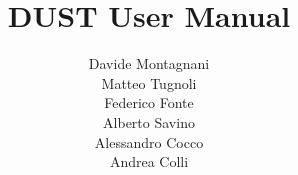 
\def\Company{}
\def\Institute{}
\def\Department{}

\def\BoldTitle{DUST User Manual}

\def\Subtitle{}
\def\Authors{ Davide Montagnani \\ Matteo Tugnoli \\ Federico Fonte \\ Alberto Savino \\ Alessandro Cocco \\ Andrea Colli} 


\title{\textbf{\BoldTitle}\\\Subtitle}
\author{\Authors \\ \\ \\ \Institute\\ \Department\\}

